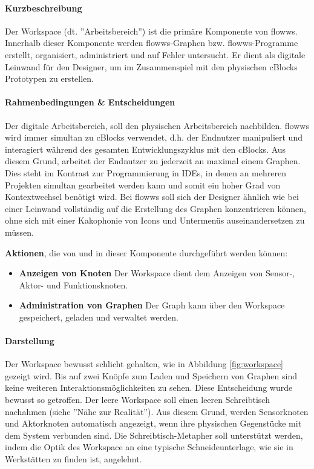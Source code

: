\paragraph{Kurzbeschreibung} Der Workspace (dt. ''Arbeitsbereich'') ist die primäre Komponente von flowws. Innerhalb dieser Komponente werden flowws-Graphen bzw. flowws-Programme erstellt, organisiert, administriert und auf Fehler untersucht. Er dient als digitale Leinwand für den Designer, um im Zusammenspiel mit den physischen cBlocks Prototypen zu erstellen.

\paragraph{Rahmenbedingungen \& Entscheidungen} Der digitale Arbeitsbereich, soll den physischen Arbeitsbereich nachbilden. flowws wird immer simultan zu cBlocks verwendet, d.h. der Endnutzer manipuliert und interagiert während des gesamten Entwicklungszyklus mit den cBlocks. Aus diesem Grund, arbeitet der Endnutzer zu jederzeit an maximal einem Graphen. Dies steht im Kontrast zur Programmierung in \acp{IDE}, in denen an mehreren Projekten simultan gearbeitet werden kann und somit ein hoher Grad von Kontextwechsel benötigt wird. Bei flowws soll sich der Designer ähnlich wie bei einer Leinwand vollständig auf die Erstellung des Graphen konzentrieren können, ohne sich mit einer Kakophonie von Icons und Untermenüs auseinandersetzen zu müssen. 

\textbf{Aktionen}, die von und in dieser Komponente durchgeführt werden können: 
\begin{itemize}
    \item \textbf{Anzeigen von Knoten} Der Workspace dient dem Anzeigen von Sensor-, Aktor- und Funktionsknoten. 
    \item \textbf{Administration von Graphen} Der Graph kann über den Workspace gespeichert, geladen und verwaltet werden. 
\end{itemize}

\paragraph{Darstellung} Der Workspace bewusst schlicht gehalten, wie in Abbildung \ref{fig:workspace} gezeigt wird. Bis auf zwei Knöpfe zum Laden und Speichern von Graphen sind keine weiteren Interaktionsmöglichkeiten zu sehen. Diese Entscheidung wurde bewusst so getroffen. Der leere Workspace soll einen leeren Schreibtisch nachahmen (siehe ''Nähe zur Realität''). Aus diesem Grund, werden Sensorknoten und Aktorknoten automatisch angezeigt, wenn ihre physischen Gegenstücke mit dem System verbunden sind. Die Schreibtisch-Metapher soll unterstützt werden, indem die Optik des Workspace an eine typische Schneideunterlage, wie sie in Werkstätten zu finden ist, angelehnt.

